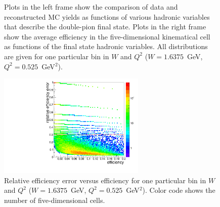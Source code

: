  
\begin{figure}[htp]
\begin{center}
\caption{\small Plots in the left frame show the comparison of data and reconstructed MC yields as functions of various hadronic variables that describe the double-pion final state. Plots in the right frame show the average efficiency in the five-dimensional kinematical cell as functions of the final state hadronic variables. All distributions are given for one particular bin in $W$ and $Q^2$ ($W = 1.6375$~GeV, $Q^2 = 0.525$~GeV$^2$).} \label{fig:eff_data_sim}
\end{center}
\end{figure}


\begin{figure}[htp]
\begin{center}
\includegraphics[width=7cm]{pictures/cross_sction/efficiency/eff_err.pdf}
\caption{\small Relative efficiency error versus efficiency for one particular bin in $W$ and $Q^2$ ($W = 1.6375$~GeV, $Q^2 = 0.525$~GeV$^2$). Color code shows the number of five-dimensional cells.} \label{fig:eff_err}
\end{center}
\end{figure}


